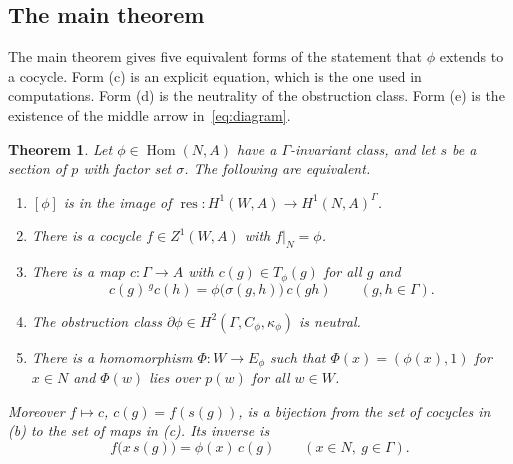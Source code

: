\documentclass[12pt,letterpaper]{article}
\numberwithin{equation}{section}
\theoremstyle{plain}
\newtheorem{theorem}{Theorem}[section]
\theoremstyle{definition}
\newcommand{\act}[2]{{}^{#1}\!#2}          %
\DeclareMathOperator{\Hom}{Hom}
\DeclareMathOperator{\res}{res}
\begin{document}
\subsection{The main theorem}

The main theorem gives five equivalent forms of the statement that
$\phi$ extends to a cocycle. Form (c) is an explicit equation, which is
the one used in computations. Form (d) is the neutrality of the
obstruction class. Form (e) is the existence of the middle arrow
in~\eqref{eq:diagram}.

\begin{theorem}\label{thm:main}
Let $\phi\in\Hom(N,A)$ have a $\Gamma$-invariant class, and let $s$ be a
section of $p$ with factor set $\sigma$. The following are equivalent.
\begin{enumerate}[label=\textup{(\alph*)},itemsep=1pt]
\item $[\phi]$ is in the image of $\res:H^1(W,A)\to H^1(N,A)^\Gamma$.
\item There is a cocycle $f\in Z^1(W,A)$ with $f|_N=\phi$.
\item There is a map $c:\Gamma\to A$ with $c(g)\in T_\phi(g)$ for all $g$
and
\begin{equation}\label{eq:c}
c(g)\,\act{g}{c(h)}=\phi\bigl(\sigma(g,h)\bigr)\,c(gh)\qquad(g,h\in\Gamma).
\end{equation}
\item The obstruction class $\partial\phi\in
H^2(\Gamma,C_\phi,\kappa_\phi)$ is neutral.
\item There is a homomorphism $\Phi:W\to E_\phi$ such that
$\Phi(x)=(\phi(x),1)$ for $x\in N$ and $\Phi(w)$ lies over $p(w)$ for all
$w\in W$.
\end{enumerate}
Moreover $f\mapsto c$, $c(g)=f(s(g))$, is a bijection from the set of
cocycles in \textup{(b)} to the set of maps in \textup{(c)}. Its inverse is
\begin{equation}\label{eq:fc}
f\bigl(x\,s(g)\bigr)=\phi(x)\,c(g)\qquad(x\in N,\ g\in\Gamma).
\end{equation}
\end{theorem}
\end{document}
